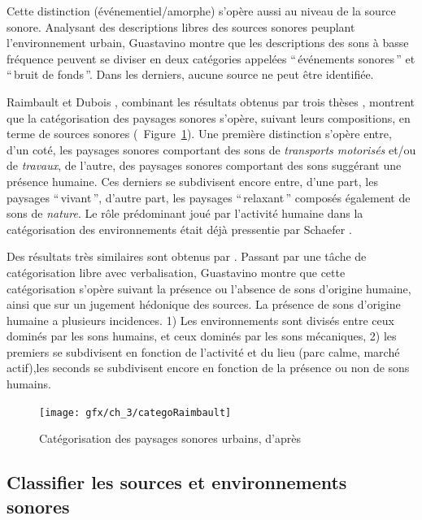 Cette distinction (événementiel/amorphe) s'opère aussi au niveau de la source sonore. Analysant des descriptions libres des sources sonores peuplant l’environnement urbain, Guastavino montre que les descriptions des sons à basse fréquence peuvent se diviser en deux catégories appelées ``\,événements sonores\,'' et ``\,bruit de fonds\,''. Dans les derniers, aucune source ne peut être identifiée.

Raimbault et Dubois \citep{raimbault2005urban}, combinant les résultats obtenus par trois thèses \citep{maffiolo_caracterisation_1999, raimbault2002simulation, guastavino_etude_2003}, montrent que la catégorisation des paysages sonores s'opère, suivant leurs compositions, en terme de sources sonores (\cf~Figure~\ref{fig:catSoundscapeRaimbault}). Une première distinction s'opère entre, d'un coté, les paysages sonores comportant des sons de \emph{transports motorisés} et/ou de \emph{travaux}, de l'autre, des paysages sonores comportant des sons suggérant une présence humaine. Ces derniers se subdivisent encore entre, d'une part, les paysages ``\,vivant\,'', d'autre part, les paysages ``\,relaxant\,'' composés également de sons de \emph{nature}. Le rôle prédominant joué par l'activité humaine dans la catégorisation des environnements était déjà pressentie par Schaefer \citep{schafer1977tuning}.

Des résultats très similaires sont obtenus par \citep{guastavino2007categorization}. Passant par une tâche de catégorisation libre avec verbalisation, Guastavino montre que cette catégorisation s'opère suivant la présence ou l'absence de sons d'origine humaine, ainsi que sur un jugement hédonique des sources. La présence de sons d'origine humaine a plusieurs incidences. 1) Les environnements sont divisés entre ceux dominés par les sons humains, et ceux dominés par les sons mécaniques, 2) les premiers se subdivisent en fonction de l'activité et du lieu (parc calme, marché actif),les seconds se subdivisent encore en fonction de la présence ou non de sons humains.

\begin{figure}[t]
        \myfloatalign
        \texttt{[image: gfx/ch\_3/categoRaimbault]}
        \caption[Catégorisation des paysages sonores urbains.]{Catégorisation des paysages sonores urbains, d'après \citep{raimbault2005urban}}\label{fig:catSoundscapeRaimbault}
\end{figure}

\subsection{Classifier les sources et environnements sonores}

